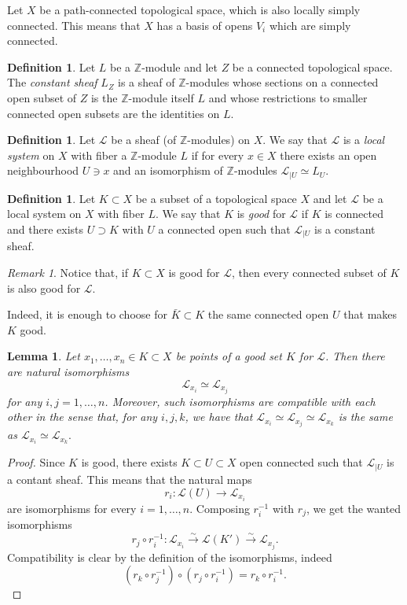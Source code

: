 \documentclass[a4paper,12 pt,titlepage,twoside]{book}
\newcommand{\numberset}{\mathbb}
\newcommand{\Z}{\numberset{Z}}
\newcommand{\ls}{\mathcal{L}}
\theoremstyle{plain}
\theoremstyle{theorem}
\newtheorem{lemma}[thm]{Lemma}
\theoremstyle{definition}
\newtheorem{defn}[thm]{Definition}
\theoremstyle{remark}
\newtheorem{oss}[thm]{Remark}
\begin{document}
Let $X$ be a path-connected topological space, which is also locally simply connected. This means that $X$ has a basis of opens $V_i$ which are simply connected.
\begin{defn}
	Let $L$ be a $\Z$-module and let $Z$ be a connected topological space. The \emph{constant sheaf} $L_Z$ is a sheaf of $\Z$-modules whose sections on a connected open subset of $Z$ is the $\Z$-module itself $L$ and whose restrictions to smaller connected open subsets are the identities on $L$.
\end{defn}
\begin{defn}
	Let $\mathcal{L}$ be a sheaf (of $\Z$-modules) on $X$. We say that $\mathcal{L}$ is a \emph{local system} on $X$ with fiber a $\Z$-module $L$ if for every $x \in X$ there exists an open neighbourhood $U \ni x$ and an isomorphism of $\Z$-modules $\mathcal{L}_{\mid U} \simeq L_U$.
\end{defn}
\begin{defn}
	Let $K \subset X$ be a subset of a topological space $X$ and let $\mathcal{L}$ be a local system on $X$ with fiber $L$. We say that $K$ is \emph{good} for $\mathcal{L}$ if $K$ is connected and there exists $U \supset K$ with $U$ a connected open such that $\mathcal{L}_{\mid U}$ is a constant sheaf.
\end{defn}
\begin{oss}\label{rmk: subset of good is good}
	Notice that, if $K \subset X$ is good for $\mathcal{L}$, then every connected subset of $K$ is also good for $\mathcal{L}$. 
	
	Indeed, it is enough to choose for $\bar{K} \subset K$ the same connected open $U$ that makes $K$ good.
\end{oss}
\begin{lemma}\label{lem: isomorphism of stalk in good set}
	Let $x_1, \dots,x_n \in K \subset X$ be points of a good set $K$ for $\mathcal{L}$. Then there are natural isomorphisms $$\mathcal{L}_{x_i} \simeq \mathcal{L}_{x_j}$$ for any $i,j=1, \dots,n$. Moreover, such isomorphisms are compatible with each other in the sense that, for any $i,j,k$, we have that $ \mathcal{L}_{x_i} \simeq \mathcal{L}_{x_j} \simeq \mathcal{L}_{x_k}$ is the same as $\mathcal{L}_{x_i} \simeq \mathcal{L}_{x_k}.$
\end{lemma}
\begin{proof}
	Since $K$ is good, there exists $K \subset U \subset X$ open connected such that $\ls_{\mid U}$ is a contant sheaf. This means that the natural maps $$r_i \colon \ls(U) \rightarrow \ls_{x_i}$$ are isomorphisms for every $i=1,\dots,n$. Composing $r_i^{-1}$ with $r_j$, we get the wanted isomorphisms $$r_j \circ r_i^{-1} \colon \ls_{x_i} \stackrel{\sim}{\longrightarrow} \ls(K') \stackrel{\sim}{\longrightarrow} \ls_{x_j}.$$Compatibility is clear by the definition of the isomorphisms, indeed $$(r_k \circ r_j^{-1}) \circ (r_j \circ r_i^{-1}) = r_k \circ r_i^{-1}.$$
	\end{proof}
\end{document}

